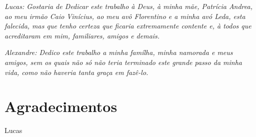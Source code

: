 \documentclass[a4paper,oneside,12pt]{book}
\begin{document}
\newpage


\begin{flushright}
\begin{minipage}{0.5\textwidth}

\vspace{15.0cm}



\textit{Lucas:
Gostaria de Dedicar este trabalho à Deus, à minha mãe, Patrícia Andrea, ao meu irmão Caio Vinícius, ao meu avô Florentino e a minha avó Leda, esta falecida, mas que tenho certeza que ficaria extremamente contente e, à todos que acreditaram em mim, familiares, amigos e demais.
}

\textit{Alexandre:
Dedico este trabalho a minha famílha, minha namorada e meus amigos, sem os quais
não só não teria terminado este grande passo da minha vida, como não haveria
tanta graça em fazê-lo.
}

\end{minipage}
\end{flushright}


\chapter*{Agradecimentos}

\thispagestyle{myheadings}

\noindent


Lucas
\end{document}
